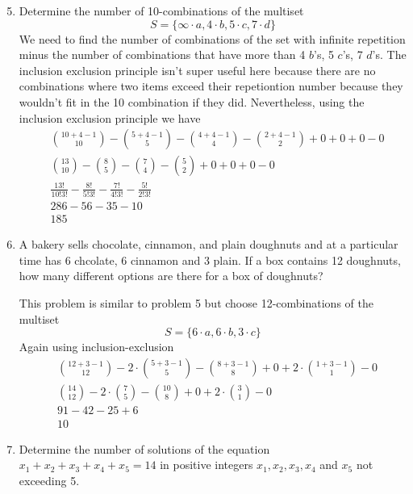 \documentclass{article}
\begin{document}
\begin{enumerate}
\setcounter{enumi}{4}
\item
Determine the number of 10-combinations of the multiset
\[S=\{\infty\cdot a,4\cdot b,5\cdot c,7\cdot d\}\]
We need to find the number of combinations of the set with infinite repetition  minus the number of combinations that have more than 4 $b$'s, 5 $c$'s, 7 $d$'s. The inclusion exclusion principle isn't super useful here because there are no combinations where two items exceed their repetiontion number because they wouldn't fit in the 10 combination if they did. Nevertheless, using the inclusion exclusion principle we have
\begin{align*}
  &\binom{10+4-1}{10}-\binom{5+4-1}{5}-\binom{4+4-1}{4}-\binom{2+4-1}{2}+0+0+0-0\\
  &\binom{13}{10}-\binom{8}{5}-\binom{7}{4}-\binom{5}{2}+0+0+0-0\\
  &\frac{13!}{10!3!}-\frac{8!}{5!3!}-\frac{7!}{4!3!}-\frac{5!}{2!3!}\\
  &286-56-35-10\\
  &185
\end{align*}
\item
A bakery sells chocolate, cinnamon, and plain doughnuts and at a particular time has 6 chcolate, 6 cinnamon and 3 plain. If a box contains 12 doughnuts, how many different options are there for a box of doughnuts?

This problem is similar to problem 5 but choose 12-combinations of the multiset
\[S=\{6\cdot a,6\cdot b,3\cdot c\}\]
Again using inclusion-exclusion
\begin{align*}
  &\binom{12+3-1}{12}-2\cdot\binom{5+3-1}{5}-\binom{8+3-1}{8}+0+2\cdot\binom{1+3-1}{1}-0\\
  &\binom{14}{12}-2\cdot\binom{7}{5}-\binom{10}{8}+0+2\cdot\binom{3}{1}-0\\
  &91-42-25+6\\
  &10
\end{align*}
\setcounter{enumi}{7}
\item
Determine the number of solutions of the equation $x_1+x_2+x_3+x_4+x_5=14$ in positive integers $x_1,x_2,x_3,x_4$ and $x_5$ not exceeding 5.


\end{enumerate}
\end{document}
